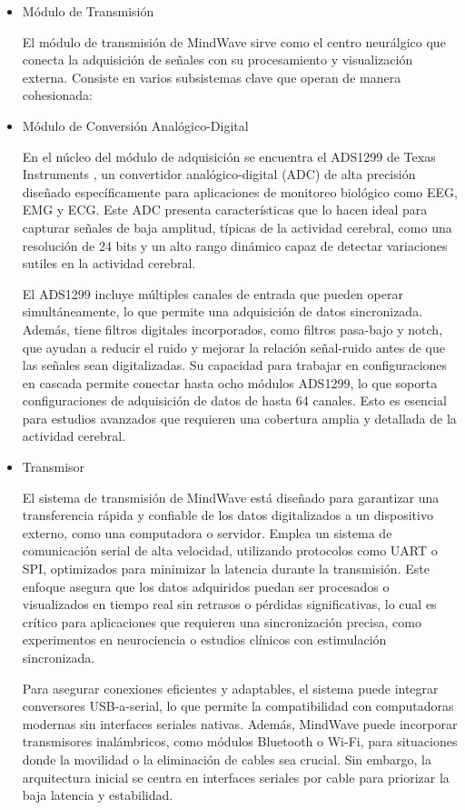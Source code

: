 \begin{itemize}
    \item {Módulo de Transmisión}

El módulo de transmisión de MindWave sirve como el centro neurálgico que conecta la adquisición de señales con su procesamiento y visualización externa. Consiste en varios subsistemas clave que operan de manera cohesionada:

    \item Módulo de Conversión Analógico-Digital

En el núcleo del módulo de adquisición se encuentra el ADS1299 de Texas Instruments \cite{TI_ADS1299}, un convertidor analógico-digital (ADC) de alta precisión diseñado específicamente para aplicaciones de monitoreo biológico como EEG, EMG y ECG. Este ADC presenta características que lo hacen ideal para capturar señales de baja amplitud, típicas de la actividad cerebral, como una resolución de 24 bits y un alto rango dinámico capaz de detectar variaciones sutiles en la actividad cerebral.

El ADS1299 incluye múltiples canales de entrada que pueden operar simultáneamente, lo que permite una adquisición de datos sincronizada. Además, tiene filtros digitales incorporados, como filtros pasa-bajo y notch, que ayudan a reducir el ruido y mejorar la relación señal-ruido antes de que las señales sean digitalizadas. Su capacidad para trabajar en configuraciones en cascada permite conectar hasta ocho módulos ADS1299, lo que soporta configuraciones de adquisición de datos de hasta 64 canales. Esto es esencial para estudios avanzados que requieren una cobertura amplia y detallada de la actividad cerebral.

    \item Transmisor

El sistema de transmisión de MindWave está diseñado para garantizar una transferencia rápida y confiable de los datos digitalizados a un dispositivo externo, como una computadora o servidor. Emplea un sistema de comunicación serial de alta velocidad, utilizando protocolos como UART o SPI, optimizados para minimizar la latencia durante la transmisión. Este enfoque asegura que los datos adquiridos puedan ser procesados o visualizados en tiempo real sin retrasos o pérdidas significativas, lo cual es crítico para aplicaciones que requieren una sincronización precisa, como experimentos en neurociencia o estudios clínicos con estimulación sincronizada.

Para asegurar conexiones eficientes y adaptables, el sistema puede integrar conversores USB-a-serial, lo que permite la compatibilidad con computadoras modernas sin interfaces seriales nativas. Además, MindWave puede incorporar transmisores inalámbricos, como módulos Bluetooth o Wi-Fi, para situaciones donde la movilidad o la eliminación de cables sea crucial. Sin embargo, la arquitectura inicial se centra en interfaces seriales por cable para priorizar la baja latencia y estabilidad.


\end{itemize}
